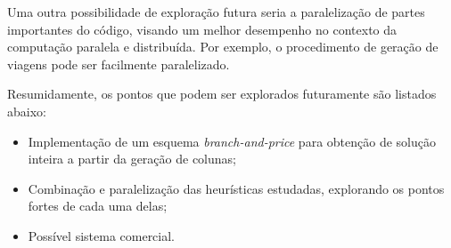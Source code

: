 Uma outra possibilidade de exploração futura seria a paralelização de partes importantes do código,
visando um melhor desempenho no contexto da computação paralela e distribuída. Por exemplo, o
procedimento de geração de viagens pode ser facilmente paralelizado.

Resumidamente, os pontos que podem ser explorados futuramente são listados abaixo:

\begin{itemize} 
\item Implementação de um esquema {\it branch-and-price} para obtenção de solução inteira a partir
da geração de colunas;
\item Combinação e paralelização das heurísticas estudadas, explorando os pontos fortes de cada uma
delas;
\item Possível sistema comercial.
\end{itemize}

